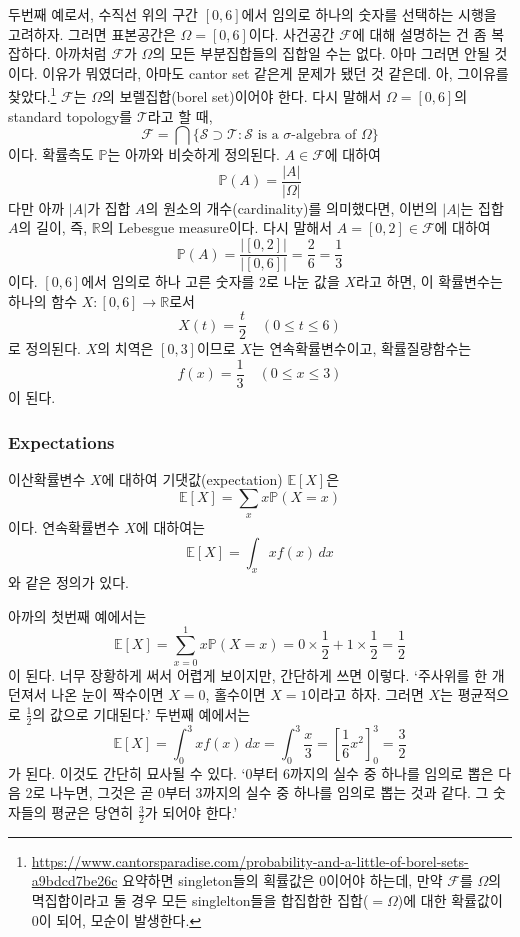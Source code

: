 \documentclass{article}
\begin{document}
두번째 예로서, 수직선 위의 구간 \([0,6]\)에서 임의로 하나의 숫자를 선택하는 시행을 고려하자.
그러면 표본공간은 \(\Omega=[0,6]\)이다.
사건공간 \(\mathcal F\)에 대해 설명하는 건 좀 복잡하다.
아까처럼 \(\mathcal F\)가 \(\Omega\)의 모든 부분집합들의 집합일 수는 없다.
아마 그러면 안될 것이다. 이유가 뭐였더라, 아마도 cantor set 같은게 문제가 됐던 것 같은데.
아, 그이유를 찾았다.\footnote{\url{https://www.cantorsparadise.com/probability-and-a-little-of-borel-sets-a9bdcd7be26c}
요약하면 singleton들의 획률값은 0이어야 하는데, 만약 \(\mathcal F\)를 \(\Omega\)의 멱집합이라고 둘 경우 모든 singlelton들을 합집합한 집합(\(=\Omega\))에 대한 확률값이 0이 되어, 모순이 발생한다.}
\(\mathcal F\)는 \(\Omega\)의 보렐집합(borel set)이어야 한다.
다시 말해서 \(\Omega=[0,6]\)의 standard topology를 \(\mathcal T\)라고 할 때,
\[\mathcal F=\bigcap\{\mathcal S\supset\mathcal T:\mathcal S\text{ is a \(\sigma\)-algebra of \(\Omega\)}\}\]
이다.
확률측도 \(\mathbb P\)는 아까와 비슷하게 정의된다.
\(A\in\mathcal F\)에 대하여
\[\mathbb P(A)=\frac{|A|}{|\Omega|}\]
다만 아까 \(|A|\)가  집합 \(A\)의 원소의 개수(cardinality)를 의미했다면, 이번의 \(|A|\)는 집합 \(A\)의 길이, 즉, \(\mathbb R\)의 Lebesgue measure이다.
다시 말해서 \(A=[0,2]\in\mathcal F\)에 대하여
\[\mathbb P(A)=\frac{|[0,2]|}{|[0,6]|}=\frac26=\frac13\]
이다.
\([0,6]\)에서 임의로 하나 고른 숫자를 2로 나눈 값을 \(X\)라고 하면, 이 확률변수는 하나의 함수 \(X:[0,6]\to\mathbb R\)로서
\[X(t)=\frac t2\quad(0\le t\le6)\]
로 정의된다.
\(X\)의 치역은 \([0,3]\)이므로 \(X\)는 연속확률변수이고, 확률질량함수는
\[f(x)=\frac13\quad(0\le x\le3)\]
이 된다.

%
\subsubsection{Expectations}
이산확률변수 \(X\)에 대하여 기댓값(expectation) \(\mathbb E[X]\)은
\[\mathbb E[X]=\sum_xx\mathbb P(X=x)\]
이다.
연속확률변수 \(X\)에 대하여는
\[\mathbb E[X]=\int_xxf(x)\,dx\]
와 같은 정의가 있다.

아까의 첫번째 예에서는
\[\mathbb E[X]=\sum_{x=0}^1x\mathbb P(X=x)=0\times\frac12+1\times\frac12=\frac12\]
이 된다.
너무 장황하게 써서 어렵게 보이지만, 간단하게 쓰면 이렇다.
`주사위를 한 개 던져서 나온 눈이 짝수이면 \(X=0\), 홀수이면 \(X=1\)이라고 하자.
그러면 \(X\)는 평균적으로 \(\frac12\)의 값으로 기대된다.'
두번째 예에서는
\[\mathbb E[X]=\int_0^3xf(x)\,dx=\int_0^3\frac x3=\left[\frac16x^2\right]_0^3=\frac32\]
가 된다.
이것도 간단히 묘사될 수 있다.
`0부터 6까지의 실수 중 하나를 임의로 뽑은 다음 2로 나누면, 그것은 곧 0부터 3까지의 실수 중 하나를 임의로 뽑는 것과 같다.
그 숫자들의 평균은 당연히 \(\frac32\)가 되어야 한다.'
\end{document}

